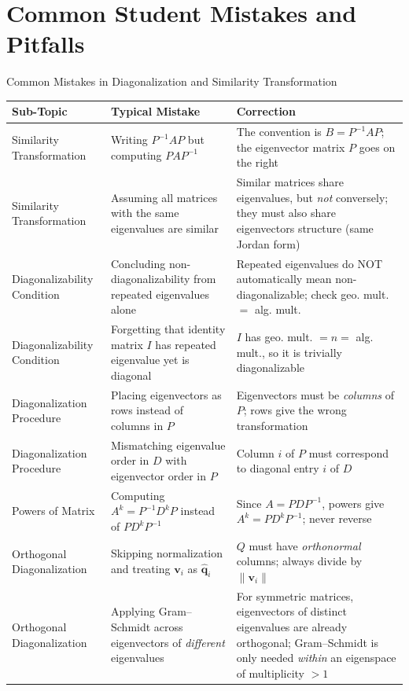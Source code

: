 \documentclass[12pt,a4paper]{article}
\begin{document}
\section{Common Student Mistakes and Pitfalls}

\begin{mistakebox}{Common Mistakes in Diagonalization and Similarity Transformation}
\begin{tabular}{@{}p{3.8cm}p{5.0cm}p{5.2cm}@{}}
\toprule
\textbf{Sub-Topic} & \textbf{Typical Mistake} & \textbf{Correction} \\
\midrule
Similarity Transformation & Writing $P^{-1}AP$ but computing $PAP^{-1}$ & The convention is $B = P^{-1}AP$; the eigenvector matrix $P$ goes on the right \\
\addlinespace
Similarity Transformation & Assuming all matrices with the same eigenvalues are similar & Similar matrices share eigenvalues, but \emph{not} conversely; they must also share eigenvectors structure (same Jordan form) \\
\addlinespace
Diagonalizability Condition & Concluding non-diagonalizability from repeated eigenvalues alone & Repeated eigenvalues do NOT automatically mean non-diagonalizable; check geo. mult. $=$ alg. mult. \\
\addlinespace
Diagonalizability Condition & Forgetting that identity matrix $I$ has repeated eigenvalue yet is diagonal & $I$ has geo. mult. $= n =$ alg. mult., so it is trivially diagonalizable \\
\addlinespace
Diagonalization Procedure & Placing eigenvectors as rows instead of columns in $P$ & Eigenvectors must be \emph{columns} of $P$; rows give the wrong transformation \\
\addlinespace
Diagonalization Procedure & Mismatching eigenvalue order in $D$ with eigenvector order in $P$ & Column $i$ of $P$ must correspond to diagonal entry $i$ of $D$ \\
\addlinespace
Powers of Matrix & Computing $A^k = P^{-1} D^k P$ instead of $PD^k P^{-1}$ & Since $A = PDP^{-1}$, powers give $A^k = P D^k P^{-1}$; never reverse \\
\addlinespace
Orthogonal Diagonalization & Skipping normalization and treating $\mathbf{v}_i$ as $\hat{\mathbf{q}}_i$ & $Q$ must have \emph{orthonormal} columns; always divide by $\|\mathbf{v}_i\|$ \\
\addlinespace
Orthogonal Diagonalization & Applying Gram--Schmidt across eigenvectors of \emph{different} eigenvalues & For symmetric matrices, eigenvectors of distinct eigenvalues are already orthogonal; Gram--Schmidt is only needed \emph{within} an eigenspace of multiplicity $>1$ \\
\bottomrule
\end{tabular}
\end{mistakebox}
\end{document}
